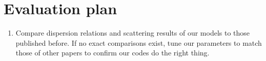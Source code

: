 \chapter{Evaluation plan}

\begin{enumerate}
  \item Compare dispersion relations and scattering results of our models to
        those published before. If no exact comparisons exist, tune our
        parameters to match those of other papers to confirm our codes do the
        right thing.
\end{enumerate}
